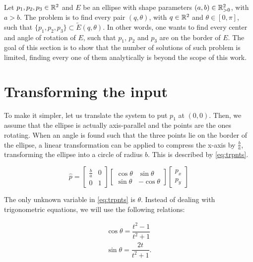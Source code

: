 Let $p_1, p_2, p_3 \in \mathbb{R}^2$ and $E$ be an ellipse with shape parameters $(a, b) \in \mathbb{R}^2_{>0}$, with $a > b$. The problem is to find every pair $(q, \theta)$, with $q \in \mathbb{R}^2$ and $\theta \in [0, \pi]$, such that $\{p_1, p_2, p_3\} \subset \tilde{E}(q, \theta)$. In other words, one wants to find every center and angle of rotation of $E$, such that $p_1$, $p_2$ and $p_3$ are on the border of $E$.
The goal of this section is to show that the number of solutions of such problem is limited, finding every one of them analytically is beyond the scope of this work.

\section{Transforming the input}

To make it simpler, let us translate the system to put $p_1$ at $(0,0)$. Then, we assume that the ellipse is actually axis-parallel and the points are the ones rotating. When an angle is found such that the three points lie on the border of the ellipse, a linear transformation can be applied to compress the x-axis by $\frac{b}{a}$, transforming the ellipse into a circle of radius $b$. This is described by \autoref{eq:trpnts}.

\begin{equation}\label{eq:trpnts}
\hat{p}=\left[\begin{array}{cc}
\frac{b}{a}&0\\
0&1
\end{array}\right]
\left[\begin{array}{cc}
\cos{\theta}&\sin{\theta}\\
\sin{\theta}&-\cos{\theta}
\end{array}\right]\left[\begin{array}{c}
p_x\\
p_y
\end{array}\right]
\end{equation}

The only unknown variable in \autoref{eq:trpnts} is $\theta$. Instead of dealing with trigonometric equations, we will use the following relations:

\begin{equation}\label{eq:trigId}
	\begin{array}{c}
\cos{\theta} = \dfrac{t^2-1}{t^2+1}\\
\sin{\theta} = \dfrac{2t}{t^2+1}.
\end{array}
\end{equation}

